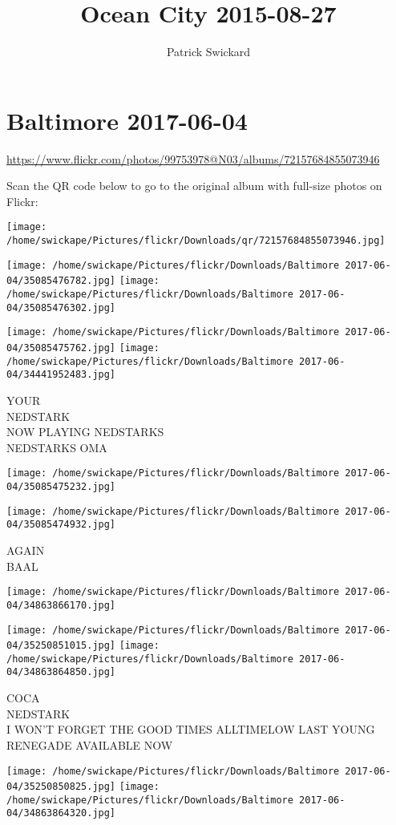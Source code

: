 \documentclass[10pt,letterpaper]{article}
\title{Ocean City 2015-08-27}
\author{Patrick Swickard}
\date{}
\begin{document}
\section*{Baltimore 2017-06-04}

\url{https://www.flickr.com/photos/99753978@N03/albums/72157684855073946}

Scan the QR code below to go to the original album with full-size photos on Flickr:

\texttt{[image: /home/swickape/Pictures/flickr/Downloads/qr/72157684855073946.jpg]}
\pagebreak

\texttt{[image: /home/swickape/Pictures/flickr/Downloads/Baltimore 2017-06-04/35085476782.jpg]}
\texttt{[image: /home/swickape/Pictures/flickr/Downloads/Baltimore 2017-06-04/35085476302.jpg]}

\texttt{[image: /home/swickape/Pictures/flickr/Downloads/Baltimore 2017-06-04/35085475762.jpg]}
\texttt{[image: /home/swickape/Pictures/flickr/Downloads/Baltimore 2017-06-04/34441952483.jpg]}

YOUR\\
NEDSTARK\\
NOW PLAYING NEDSTARKS\\
NEDSTARKS OMA
\pagebreak

\texttt{[image: /home/swickape/Pictures/flickr/Downloads/Baltimore 2017-06-04/35085475232.jpg]}

\vspace{0.25in}
\texttt{[image: /home/swickape/Pictures/flickr/Downloads/Baltimore 2017-06-04/35085474932.jpg]}

AGAIN\\
BAAL
\pagebreak

\texttt{[image: /home/swickape/Pictures/flickr/Downloads/Baltimore 2017-06-04/34863866170.jpg]}

\vspace{0.25in}
\texttt{[image: /home/swickape/Pictures/flickr/Downloads/Baltimore 2017-06-04/35250851015.jpg]}
\texttt{[image: /home/swickape/Pictures/flickr/Downloads/Baltimore 2017-06-04/34863864850.jpg]}

COCA\\
NEDSTARK\\
I WON'T FORGET THE GOOD TIMES ALLTIMELOW LAST YOUNG RENEGADE AVAILABLE NOW
\pagebreak

\texttt{[image: /home/swickape/Pictures/flickr/Downloads/Baltimore 2017-06-04/35250850825.jpg]}
\texttt{[image: /home/swickape/Pictures/flickr/Downloads/Baltimore 2017-06-04/34863864320.jpg]}
\end{document}
